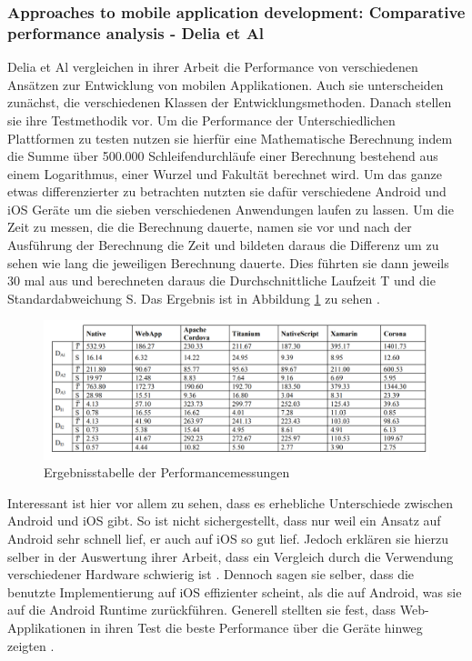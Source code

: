 \subsubsection{Approaches to mobile application development: Comparative performance analysis - Delia et Al}
Delia et Al vergleichen in ihrer Arbeit die Performance von verschiedenen Ansätzen zur Entwicklung von mobilen Applikationen. Auch sie unterscheiden zunächst, die verschiedenen Klassen der Entwicklungsmethoden. Danach stellen sie ihre Testmethodik vor. Um die Performance der Unterschiedlichen Plattformen zu testen nutzen sie hierfür eine Mathematische Berechnung indem die Summe über 500.000 Schleifendurchläufe einer Berechnung bestehend aus einem Logarithmus, einer Wurzel und Fakultät berechnet wird. Um das ganze etwas differenzierter zu betrachten nutzten sie dafür verschiedene Android und iOS Geräte um die sieben verschiedenen Anwendungen laufen zu lassen. Um die Zeit zu messen, die die Berechnung dauerte, namen sie vor und nach der Ausführung der Berechnung die Zeit und bildeten daraus die Differenz um zu sehen wie lang die jeweiligen Berechnung dauerte. Dies führten sie dann jeweils 30 mal aus und berechneten daraus die Durchschnittliche Laufzeit T und die Standardabweichung S. Das Ergebnis ist in Abbildung \ref{fig:result_table_IEEE_related_work} zu sehen \cite{IEEE_development_classes}.

\begin{figure}[ht]
  \centering
  \includegraphics[width=\textwidth,keepaspectratio]{images/IEEE_Delia_Al.png}
  \caption{Ergebnisstabelle der Performancemessungen \cite{IEEE_development_classes}}
  \label{fig:result_table_IEEE_related_work}
\end{figure}

Interessant ist hier vor allem zu sehen, dass es erhebliche Unterschiede zwischen Android und iOS gibt. So ist nicht sichergestellt, dass nur weil ein Ansatz auf Android sehr schnell lief, er auch auf iOS so gut lief. Jedoch erklären sie hierzu selber in der Auswertung ihrer Arbeit, dass ein Vergleich durch die Verwendung verschiedener Hardware schwierig ist \cite{IEEE_development_classes}. Dennoch sagen sie selber, dass die benutzte Implementierung auf iOS effizienter scheint, als die auf Android, was sie auf die Android Runtime zurückführen. Generell stellten sie fest, dass Web-Applikationen in ihren Test die beste Performance über die Geräte hinweg zeigten \cite{IEEE_development_classes}.

